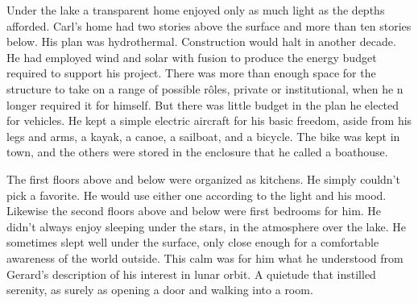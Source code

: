 

Under the lake a transparent home enjoyed only as much light as the
depths afforded.  Carl's home had two stories above the surface and
more than ten stories below.  His plan was hydrothermal.  Construction
would halt in another decade.  He had employed wind and solar with
fusion to produce the energy budget required to support his project.
There was more than enough space for the structure to take on a range
of possible r\^oles, private or institutional, when he n longer
required it for himself.  But there was little budget in the plan he
elected for vehicles.  He kept a simple electric aircraft for his
basic freedom, aside from his legs and arms, a kayak, a canoe, a
sailboat, and a bicycle.  The bike was kept in town, and the others
were stored in the enclosure that he called a boathouse.

The first floors above and below were organized as kitchens.  He
simply couldn't pick a favorite.  He would use either one according to
the light and his mood.  Likewise the second floors above and below
were first bedrooms for him.  He didn't always enjoy sleeping under
the stars, in the atmosphere over the lake.  He sometimes slept well
under the surface, only close enough for a comfortable awareness of
the world outside.  This calm was for him what he understood from
Gerard's description of his interest in lunar orbit.  A quietude that
instilled serenity, as surely as opening a door and walking into a
room.

\bye
